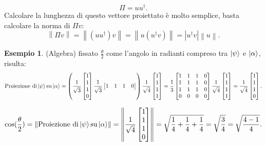 \documentclass{book}
\theoremstyle{definition}
\theoremstyle{definition}
\theoremstyle{definition}
\newtheorem*{ex}{Esempio}
\theoremstyle{plain}
\theoremstyle{plain}
\theoremstyle{plain}
\theoremstyle{plain}
\begin{document}
\begin{displaymath}
\Pi = u u^{\dagger}.
\end{displaymath}
Calcolare la lunghezza di questo vettore proiettato è molto semplice, basta calcolare la norma di $\Pi v$:
\begin{displaymath}
\left\lVert \Pi v \right\rVert =
\left\lVert (u u^{\dagger}) v \right\rVert =
\left\lVert u (u^{\dagger} v) \right\rVert = \left\lvert u^{\dagger} v \right\rvert \left\lVert u \right\rVert.
\end{displaymath}
\begin{ex}
(Algebra) fissato $\frac{\theta}{2}$ come l'angolo in radianti compreso tra $\ket{\psi}$ e $\ket{\alpha}$, risulta:
\begin{displaymath}
\text{Proiezione di} \ket{\psi} \text{su} \ket{\alpha} = \left( \frac{1}{\sqrt{3}}  \begin{bmatrix}
1 \\
1 \\
1 \\
0
\end{bmatrix}
\frac{1}{\sqrt{3}} \begin{bmatrix}
1 & 1 & 1 & 0
\end{bmatrix}
\right)
\frac{1}{\sqrt{4}} \begin{bmatrix}
1 \\
1 \\
1 \\
1
\end{bmatrix} = \frac{1}{3} \begin{bmatrix}
1 & 1 & 1 & 0 \\
1 & 1 & 1 & 0 \\
1 & 1 & 1 & 0 \\
0 & 0 & 0 & 0 \\
\end{bmatrix} \frac{1}{\sqrt{4}} \begin{bmatrix}
1 \\
1 \\
1 \\
1
\end{bmatrix} = \frac{1}{\sqrt{4}} \begin{bmatrix}
1 \\
1 \\
1 \\
0
\end{bmatrix}.
\end{displaymath}

\begin{displaymath}
\cos(\frac{\theta}{2}) = \left\lVert \text{Proiezione di} \ket{\psi} \text{su} \ket{\alpha} \right\rVert = \left\lVert \frac{1}{\sqrt{4}} \begin{bmatrix}
1 \\
1 \\
1 \\
0
\end{bmatrix} \right\rVert = \sqrt{\frac{1}{4} + \frac{1}{4} + \frac{1}{4}} = \sqrt{\frac{3}{4}} = \sqrt{\frac{4 - 1}{4}}.
\end{displaymath}


\end{ex}
\end{document}
